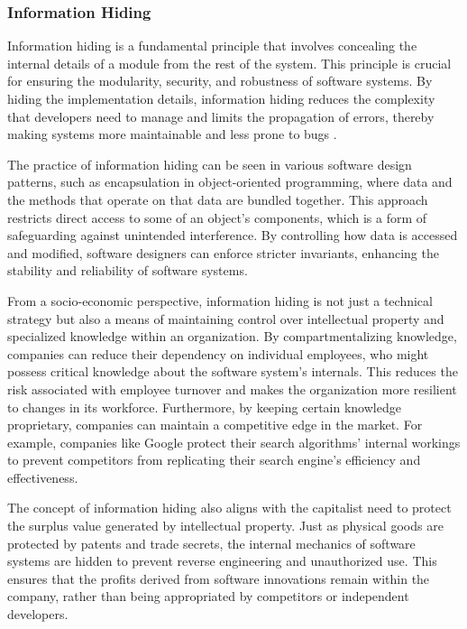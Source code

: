 \begin{refsection}
\subsubsection{Information Hiding}

Information hiding is a fundamental principle that involves concealing the internal details of a module from the rest of the system. This principle is crucial for ensuring the modularity, security, and robustness of software systems. By hiding the implementation details, information hiding reduces the complexity that developers need to manage and limits the propagation of errors, thereby making systems more maintainable and less prone to bugs \cite[pp.~201-204]{Parnas1972}.

The practice of information hiding can be seen in various software design patterns, such as encapsulation in object-oriented programming, where data and the methods that operate on that data are bundled together. This approach restricts direct access to some of an object's components, which is a form of safeguarding against unintended interference. By controlling how data is accessed and modified, software designers can enforce stricter invariants, enhancing the stability and reliability of software systems.

From a socio-economic perspective, information hiding is not just a technical strategy but also a means of maintaining control over intellectual property and specialized knowledge within an organization. By compartmentalizing knowledge, companies can reduce their dependency on individual employees, who might possess critical knowledge about the software system's internals. This reduces the risk associated with employee turnover and makes the organization more resilient to changes in its workforce. Furthermore, by keeping certain knowledge proprietary, companies can maintain a competitive edge in the market. For example, companies like Google protect their search algorithms' internal workings to prevent competitors from replicating their search engine's efficiency and effectiveness.

The concept of information hiding also aligns with the capitalist need to protect the surplus value generated by intellectual property. Just as physical goods are protected by patents and trade secrets, the internal mechanics of software systems are hidden to prevent reverse engineering and unauthorized use. This ensures that the profits derived from software innovations remain within the company, rather than being appropriated by competitors or independent developers.


\end{refsection}
